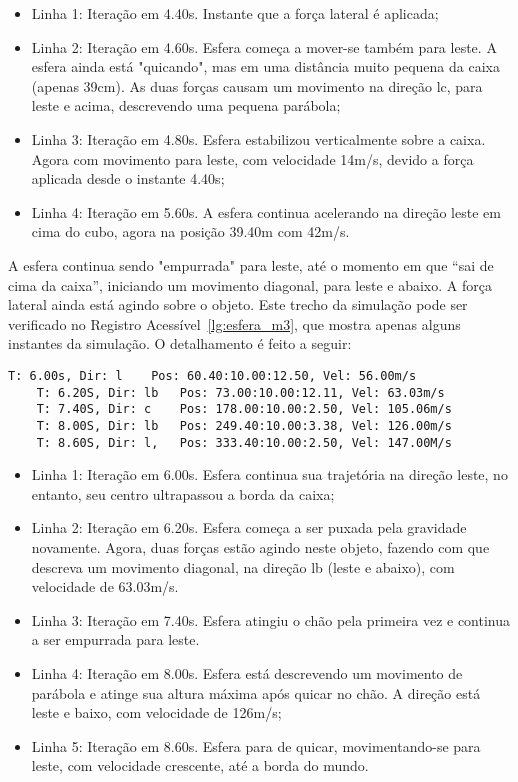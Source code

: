 \documentclass[12pt]{article}
\begin{document}
\begin{itemize}
	\item Linha 1: Iteração em 4.40s. Instante que a força lateral é aplicada;
	\item Linha 2: Iteração em 4.60s. Esfera começa a mover-se também para leste. A esfera ainda está "quicando", mas em uma distância muito pequena da caixa (apenas 39cm). As duas forças causam um movimento na direção lc, para leste e acima, descrevendo uma pequena parábola;
	\item Linha 3: Iteração em 4.80s. Esfera estabilizou verticalmente sobre a caixa. Agora com movimento para leste, com velocidade 14m/s, devido a força aplicada desde o instante 4.40s; 
	\item Linha 4: Iteração em 5.60s. A esfera continua acelerando na direção leste em cima do cubo, agora na posição 39.40m com 42m/s.
\end{itemize}

A esfera continua sendo "empurrada" para leste, até o momento em que “sai de cima da caixa”, iniciando um movimento diagonal, para leste e abaixo. A força lateral ainda está agindo sobre o objeto. Este trecho da simulação pode ser verificado no Registro Acessível~\ref{lg:esfera_m3}, que mostra apenas alguns instantes da simulação. O detalhamento é feito a seguir:

\begin{lstlisting}[frame=single,caption=Esfera se movendo diagonalmente\label{lg:esfera_m3}]
	T: 6.00s, Dir: l	Pos: 60.40:10.00:12.50, Vel: 56.00m/s
	T: 6.20S, Dir: lb 	Pos: 73.00:10.00:12.11, Vel: 63.03m/s
	T: 7.40S, Dir: c 	Pos: 178.00:10.00:2.50, Vel: 105.06m/s
	T: 8.00S, Dir: lb 	Pos: 249.40:10.00:3.38, Vel: 126.00m/s
	T: 8.60S, Dir: l, 	Pos: 333.40:10.00:2.50, Vel: 147.00M/s
\end{lstlisting}

\begin{itemize}
	\item Linha 1: Iteração em 6.00s. Esfera continua sua trajetória na direção leste, no entanto, seu centro ultrapassou a borda da caixa;
	
	\item Linha 2: Iteração em 6.20s. Esfera começa a ser puxada pela gravidade novamente. Agora, duas forças estão agindo neste objeto, fazendo com que descreva um movimento diagonal, na direção lb (leste e abaixo), com velocidade de 63.03m/s.
	
	\item Linha 3: Iteração em 7.40s. Esfera atingiu o chão pela primeira vez e continua a ser empurrada para leste.
	
	\item Linha 4: Iteração em 8.00s. Esfera está descrevendo um movimento de parábola e atinge sua altura máxima após quicar no chão. A direção está leste e baixo, com velocidade de 126m/s;
	
	\item Linha 5: Iteração em 8.60s. Esfera para de quicar, movimentando-se para leste, com velocidade crescente, até a borda do mundo.
\end{itemize}
\end{document}
